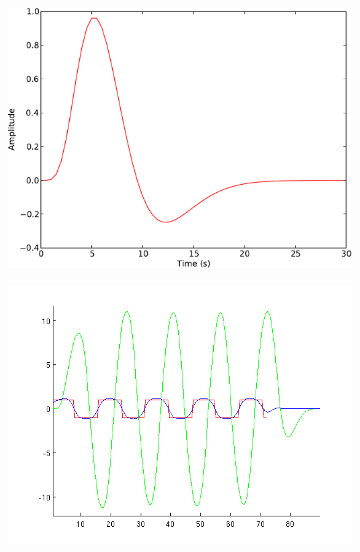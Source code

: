 \documentclass[preprint,authoryear,12pt]{elsarticle}
\begin{document}
\begin{figure}
\centering
\begin{subfigure}{0.4\textwidth}
\centering
\includegraphics[width=\textwidth]{figures/hrf}
\caption{}
\label{fig:wiener-hrf}
\end{subfigure}
\begin{subfigure}{0.4\textwidth}
\centering
\includegraphics[width=\textwidth]{figures/wiener-square}
\caption{}
\label{fig:wiener-square}
\end{subfigure}
\begin{subfigure}{0.4\textwidth}
\centering

\end{subfigure}
\end{figure}
\end{document}
